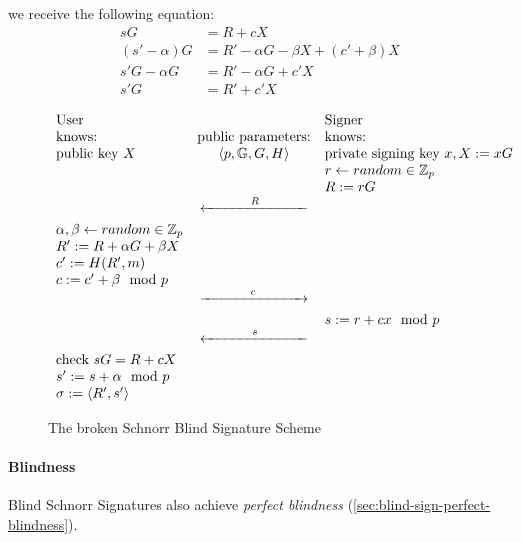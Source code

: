 we receive the following equation:
\begin{align*}
    sG & = R + c X
    \\ (s' - \alpha)G &= R' - \alpha G - \beta X + (c' + \beta)X
    \\ s'G - \alpha G &= R' - \alpha G + c' X
    \\ s'G &= R' + c' X
\end{align*}

\begin{figure}[htp]
    \begin{equation*}
        \begin{array}{ l c l }
            \text{User} &  & \text{Signer}
            \\ \text{knows:} & \text{public parameters:} & \text{knows:}
            \\ \text{public key } X & \langle p, \mathbb{G}, G, H\rangle & \text{private signing key } x, X := xG
            \\ & & r \leftarrow random \in \mathbb{Z}_p
            \\ & & R := rG
            \\ & \xleftarrow[\rule{2.5cm}{0pt}]{R} &
            \\ \alpha, \beta \leftarrow random \in \mathbb{Z}_p
            \\ R' := R + \alpha G + \beta X
            \\ c' := H(R',m)
            \\ c := c' + \beta \mod p
            \\ & \xrightarrow[\rule{2.5cm}{0pt}]{c} &
            \\ & & s := r+cx \mod p
            \\ & \xleftarrow[\rule{2.5cm}{0pt}]{s} &
            \\ \text{check } sG = R + cX
            \\ s' := s + \alpha \mod p
            \\ \sigma := \langle R',s' \rangle
        \end{array}
    \end{equation*}
    \caption{The broken Schnorr Blind Signature Scheme}
    \label{fig:schnorr-blind-sign-scheme}
\end{figure}

\paragraph{Blindness}
Blind Schnorr Signatures also achieve \textit{perfect blindness} (\autoref{sec:blind-sign-perfect-blindness}). \cite{spring:wallet-db-with-observers} \cite{cryptoeprint:2019:877}

